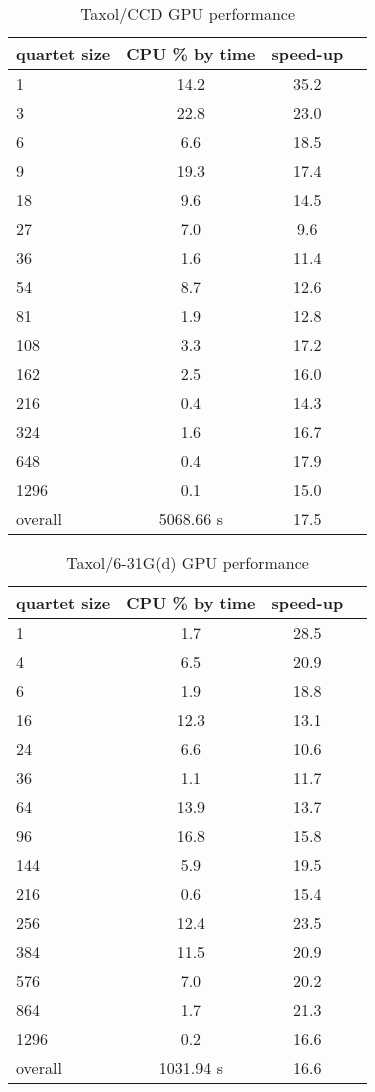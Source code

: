 \documentclass[12pt]{article}
\begin{document}
\begin{table}
  \label{results2}
  \caption {Taxol/CCD GPU performance}
  \begin{center}
    \begin{tabular}{| l | c | c | c |}
      \hline
      quartet size & CPU \% by time  &  speed-up \\
      \hline
      1 & 14.2 & 35.2 \\
      3 & 22.8 & 23.0 \\
      6 & 6.6 & 18.5 \\
      9 & 19.3 & 17.4 \\
      18 & 9.6 & 14.5 \\
      27 & 7.0 & 9.6 \\
      36 & 1.6 & 11.4 \\
      54 & 8.7 & 12.6 \\
      81 & 1.9 & 12.8 \\
      108 & 3.3 & 17.2 \\
      162 & 2.5 & 16.0 \\
      216 & 0.4 & 14.3 \\
      324 & 1.6 & 16.7 \\
      648 & 0.4 & 17.9 \\
      1296 & 0.1 & 15.0 \\
      \hline
      overall & 5068.66 s &  17.5 
    \end{tabular}
  \end{center}
\end{table}


\begin{table}
  \label{results2}
  \caption {Taxol/6-31G(d) GPU performance}
  \begin{center}
    \begin{tabular}{| l | c | c | c |}
      \hline
      quartet size & CPU \% by time  &  speed-up \\
      \hline
      1 & 1.7 & 28.5 \\
      4 & 6.5 & 20.9 \\
      6 & 1.9 & 18.8 \\
      16 & 12.3 & 13.1 \\
      24 & 6.6 & 10.6 \\
      36 & 1.1 & 11.7 \\
      64 & 13.9 & 13.7 \\
      96 & 16.8 & 15.8 \\
      144 & 5.9 & 19.5 \\
      216 & 0.6 & 15.4 \\
      256 & 12.4 & 23.5 \\
      384 & 11.5 & 20.9 \\
      576 & 7.0 & 20.2 \\
      864 & 1.7 & 21.3 \\
      1296 & 0.2 & 16.6 \\
      \hline
      overall & 1031.94 s &  16.6 
    \end{tabular}
  \end{center}
\end{table}
\end{document}
